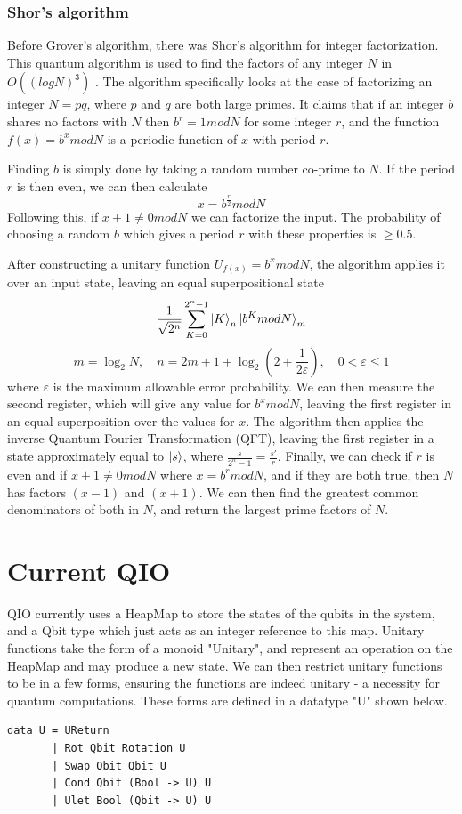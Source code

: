 \documentclass[a4paper,11pt, titlepage, twoside]{article}
\begin{document}
\subsubsection{Shor's algorithm}
Before Grover's algorithm, there was Shor's algorithm for integer factorization. This quantum algorithm is used to find the factors of any integer $N$ in ~$O((log N)^3)$ \cite{shorcomplexity}. The algorithm specifically looks at the case of factorizing an integer $N = pq$, where $p$ and $q$ are both large primes. It claims that if an integer $b$ shares no factors with $N$ then $b^r = 1 mod N$ for some integer $r$, and the function $f(x) = b^x mod N$ is a periodic function of $x$ with period $r$.\par
Finding $b$ is simply done by taking a random number co-prime to $N$. If the period $r$ is then even, we can then calculate 
$$x = b^{\frac{r}{2}} mod N$$
Following this, if $x + 1 \neq 0 mod N$ we can factorize the input. The probability of choosing a random $b$ which gives a period $r$ with these properties is $\geq 0.5$.\par
After constructing a unitary function $U_{f(x)} = b^x mod N$, the algorithm applies it over an input state, leaving an equal superpositional state 
$$\frac{1}{\sqrt{2^n}}\sum_{K=0}^{2^n-1} \ket{K}_n \ket{b^K mod N}_m$$
$$m =\log_2 N,\quad n = 2m + 1 + \log_2(2 + \frac{1}{2\varepsilon}),\quad 0 < \varepsilon \leq 1$$
where $\varepsilon$ is the maximum allowable error probability. We can then measure the second register, which will give any value for $b^x mod N$, leaving the first register in an equal superposition over the values for $x$. The algorithm then applies the inverse Quantum Fourier Transformation (QFT), leaving the first register in a state approximately equal to $\ket{s}$, where $\frac{s}{2^n-1} = \frac{s'}{r}$. Finally, we can check if $r$ is even and if $x + 1 \neq 0 mod N$ where $x = b^r mod N$, and if they are both true, then $N$ has factors $(x-1)$ and $(x+1)$. We can then find the greatest common denominators of both in $N$, and return the largest prime factors of $N$.

\section{Current QIO}
QIO currently uses a HeapMap to store the states of the qubits in the system, and a Qbit type which just acts as an integer reference to this map. Unitary functions take the form of a monoid "Unitary", and represent an operation on the HeapMap and may produce a new state. We can then restrict unitary functions to be in a few forms, ensuring the functions are indeed unitary - a necessity for quantum computations. These forms are defined in a datatype "U" shown below.
\begin{verbatim}
data U = UReturn 
       | Rot Qbit Rotation U 
       | Swap Qbit Qbit U 
       | Cond Qbit (Bool -> U) U 
       | Ulet Bool (Qbit -> U) U
\end{verbatim}
\end{document}
